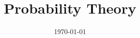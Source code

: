 \documentclass[11pt]{report}
\title{\textbf{Probability Theory}} %
\author{\scribe} %
\date{\today} %
\begin{document}
\maketitle	
\tableofcontents
\chapter{}

\chapter{}

\chapter{}

\chapter{}

\chapter{}

\end{document}
